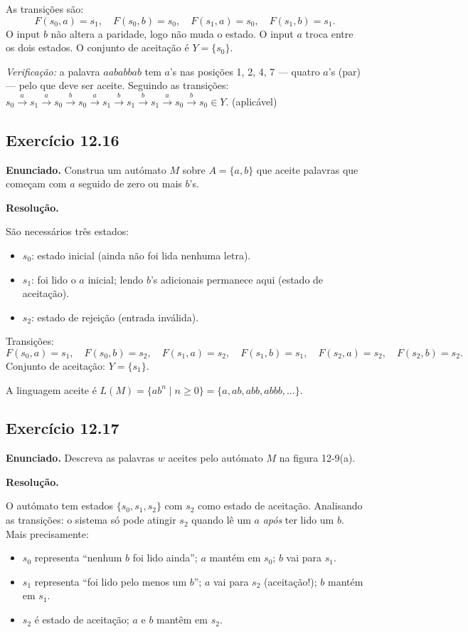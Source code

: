 \documentclass[12pt,a4paper]{article}
\begin{document}
As transições são:
\[
  F(s_0, a) = s_1,\quad F(s_0, b) = s_0,\quad
  F(s_1, a) = s_0,\quad F(s_1, b) = s_1.
\]
O input $b$ não altera a paridade, logo não muda o estado. O input $a$ troca entre os
dois estados. O conjunto de aceitação é $Y = \{s_0\}$.

\medskip
\noindent\textit{Verificação:} a palavra $aababbab$ tem $a$'s nas posições 1, 2, 4, 7 —
quatro $a$'s (par) — pelo que deve ser aceite. Seguindo as transições:
$s_0 \xrightarrow{a} s_1 \xrightarrow{a} s_0 \xrightarrow{b} s_0 \xrightarrow{a} s_1
\xrightarrow{b} s_1 \xrightarrow{b} s_1 \xrightarrow{a} s_0 \xrightarrow{b} s_0 \in Y$. (aplicável)

\subsection*{Exercício 12.16}

\textbf{Enunciado.} Construa um autómato $M$ sobre $A = \{a,b\}$ que aceite palavras que
começam com $a$ seguido de zero ou mais $b$'s.

\medskip
\textbf{Resolução.}

São necessários três estados:

\begin{itemize}
  \item $s_0$: estado inicial (ainda não foi lida nenhuma letra).
  \item $s_1$: foi lido o $a$ inicial; lendo $b$'s adicionais permanece aqui (estado de aceitação).
  \item $s_2$: estado de rejeição (entrada inválida).
\end{itemize}

Transições:
\[
  F(s_0, a) = s_1,\quad F(s_0, b) = s_2,\quad
  F(s_1, a) = s_2,\quad F(s_1, b) = s_1,\quad
  F(s_2, a) = s_2,\quad F(s_2, b) = s_2.
\]
Conjunto de aceitação: $Y = \{s_1\}$.

A linguagem aceite é $L(M) = \{ab^n \mid n \ge 0\} = \{a, ab, abb, abbb, \ldots\}$.

\subsection*{Exercício 12.17}

\textbf{Enunciado.} Descreva as palavras $w$ aceites pelo autómato $M$ na figura 12-9(a).

\medskip
\textbf{Resolução.}

O autómato tem estados $\{s_0, s_1, s_2\}$ com $s_2$ como estado de aceitação.
Analisando as transições: o sistema só pode atingir $s_2$ quando lê um $a$ \emph{após}
ter lido um $b$. Mais precisamente:
\begin{itemize}
  \item $s_0$ representa ``nenhum $b$ foi lido ainda''; $a$ mantém em $s_0$; $b$ vai para $s_1$.
  \item $s_1$ representa ``foi lido pelo menos um $b$''; $a$ vai para $s_2$ (aceitação!);
        $b$ mantém em $s_1$.
  \item $s_2$ é estado de aceitação; $a$ e $b$ mantêm em $s_2$.
\end{itemize}
\end{document}
